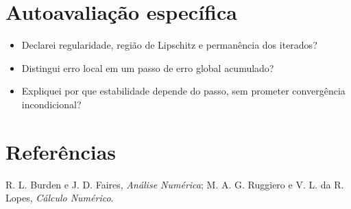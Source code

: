 \documentclass[11pt,a4paper]{article}
\begin{document}
\section{Autoavaliação específica}
\begin{itemize}
\item Declarei regularidade, região de Lipschitz e permanência dos iterados?
\item Distingui erro local em um passo de erro global acumulado?
\item Expliquei por que estabilidade depende do passo, sem prometer convergência incondicional?
\end{itemize}
\RubricaUFMT
\section{Referências}
R. L. Burden e J. D. Faires, \emph{Análise Numérica}; M. A. G. Ruggiero e V. L. da R. Lopes, \emph{Cálculo Numérico}.
\end{document}
